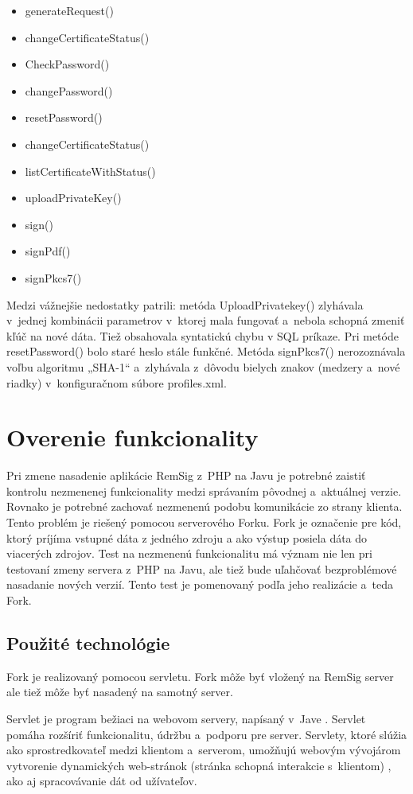 \documentclass[
  printed, %
  table,   %
oneside,
  nolof,     %
  nolot,     %
]{fithesis3}
\begin{document}
\begin{itemize}

\item generateRequest()
\item changeCertificateStatus()
\item CheckPassword()
\item changePassword()
\item resetPassword()
\item changeCertificateStatus()
\item listCertificateWithStatus()
\item uploadPrivateKey()
\item sign()
\item signPdf()
\item signPkcs7()
 \end{itemize}


Medzi vážnejšie nedostatky patrili: metóda UploadPrivatekey() zlyhávala v~jednej kombinácii parametrov v~ktorej mala fungovať a~nebola schopná zmeniť kľúč na nové dáta. Tiež obsahovala syntatickú chybu v SQL príkaze. Pri metóde resetPassword() bolo staré heslo stále funkčné. Metóda signPkcs7() nerozoznávala voľbu algoritmu „SHA-1“ a~zlyhávala z~dôvodu bielych znakov (medzery a~nové riadky) v~konfiguračnom súbore profiles.xml. 



\section{Overenie funkcionality}
Pri zmene nasadenie aplikácie RemSig z~PHP na Javu je potrebné zaistiť kontrolu nezmenenej funkcionality medzi správaním pôvodnej a~aktuálnej verzie. Rovnako je potrebné zachovať nezmenenú podobu komunikácie zo strany klienta. Tento problém je riešený pomocou serverového Forku. Fork je označenie pre kód, ktorý príjíma vstupné dáta z jedného zdroju a ako výstup posiela dáta do viacerých zdrojov. Test na nezmenenú funkcionalitu má význam nie len pri testovaní zmeny servera z~PHP na Javu, ale tiež bude uľahčovať bezproblémové nasadanie nových verzií. Tento test je pomenovaný podľa jeho realizácie a~teda Fork. 
\subsection{Použité technológie}
Fork je realizovaný pomocou servletu. Fork môže byť vložený na RemSig server ale tiež môže byť nasadený na samotný server.

Servlet je program bežiaci na webovom servery, napísaný v~Jave \cite{servlet}. Servlet pomáha rozšíriť  funkcionalitu, údržbu a~podporu pre server. Servlety, ktoré slúžia ako sprostredkovateľ medzi klientom a~serverom,  umožňujú webovým vývojárom vytvorenie dynamických web-stránok (stránka schopná interakcie s~klientom) \cite{staticVsDynamic}, ako aj spracovávanie dát od užívateľov. 
\end{document}
